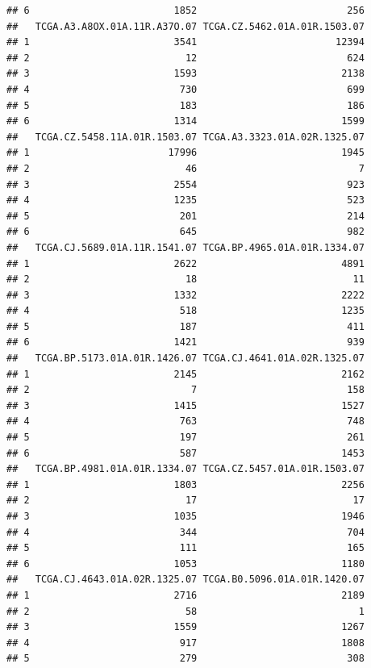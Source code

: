 \documentclass[
]{article}
\begin{document}
\begin{verbatim}
## 6                         1852                          256
##   TCGA.A3.A8OX.01A.11R.A37O.07 TCGA.CZ.5462.01A.01R.1503.07
## 1                         3541                        12394
## 2                           12                          624
## 3                         1593                         2138
## 4                          730                          699
## 5                          183                          186
## 6                         1314                         1599
##   TCGA.CZ.5458.11A.01R.1503.07 TCGA.A3.3323.01A.02R.1325.07
## 1                        17996                         1945
## 2                           46                            7
## 3                         2554                          923
## 4                         1235                          523
## 5                          201                          214
## 6                          645                          982
##   TCGA.CJ.5689.01A.11R.1541.07 TCGA.BP.4965.01A.01R.1334.07
## 1                         2622                         4891
## 2                           18                           11
## 3                         1332                         2222
## 4                          518                         1235
## 5                          187                          411
## 6                         1421                          939
##   TCGA.BP.5173.01A.01R.1426.07 TCGA.CJ.4641.01A.02R.1325.07
## 1                         2145                         2162
## 2                            7                          158
## 3                         1415                         1527
## 4                          763                          748
## 5                          197                          261
## 6                          587                         1453
##   TCGA.BP.4981.01A.01R.1334.07 TCGA.CZ.5457.01A.01R.1503.07
## 1                         1803                         2256
## 2                           17                           17
## 3                         1035                         1946
## 4                          344                          704
## 5                          111                          165
## 6                         1053                         1180
##   TCGA.CJ.4643.01A.02R.1325.07 TCGA.B0.5096.01A.01R.1420.07
## 1                         2716                         2189
## 2                           58                            1
## 3                         1559                         1267
## 4                          917                         1808
## 5                          279                          308

\end{verbatim}
\end{document}
